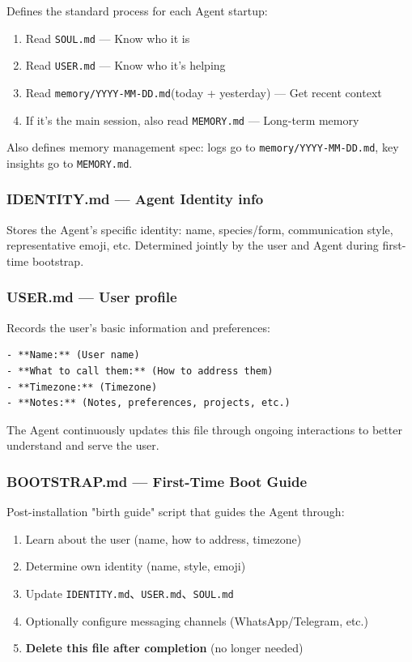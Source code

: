 Defines the standard process for each Agent startup:

\begin{enumerate}
  \item Read \texttt{SOUL.md} --- Know who it is
  \item Read \texttt{USER.md} --- Know who it's helping
  \item Read \texttt{memory/YYYY-MM-DD.md}(today + yesterday) --- Get recent context
  \item If it's the main session, also read \texttt{MEMORY.md} --- Long-term memory
\end{enumerate}

Also defines memory management spec: logs go to \texttt{memory/YYYY-MM-DD.md}, key insights go to \texttt{MEMORY.md}.

\subsubsection{IDENTITY.md --- Agent Identity info}


Stores the Agent's specific identity: name, species/form, communication style, representative emoji, etc. Determined jointly by the user and Agent during first-time bootstrap.

\subsubsection{USER.md --- User profile}


Records the user's basic information and preferences:

\begin{lstlisting}
- **Name:** (User name)
- **What to call them:** (How to address them)
- **Timezone:** (Timezone)
- **Notes:** (Notes, preferences, projects, etc.)
\end{lstlisting}

The Agent continuously updates this file through ongoing interactions to better understand and serve the user.

\subsubsection{BOOTSTRAP.md --- First-Time Boot Guide}


Post-installation "birth guide" script that guides the Agent through:

\begin{enumerate}
  \item Learn about the user (name, how to address, timezone)
  \item Determine own identity (name, style, emoji)
  \item Update \texttt{IDENTITY.md}、\texttt{USER.md}、\texttt{SOUL.md}
  \item Optionally configure messaging channels (WhatsApp/Telegram, etc.)
  \item \textbf{Delete this file after completion} (no longer needed)
\end{enumerate}

